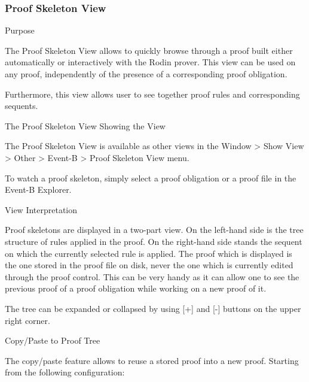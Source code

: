 \subsubsection{Proof Skeleton View}


Purpose

The Proof Skeleton View allows to quickly browse through a proof built either automatically or interactively with the Rodin prover. This view can be used on any proof, independently of the presence of a corresponding proof obligation.

Furthermore, this view allows user to see together proof rules and corresponding sequents.

The Proof Skeleton View
Showing the View

The Proof Skeleton View is available as other views in the Window > Show View > Other > Event-B > Proof Skeleton View menu.

To watch a proof skeleton, simply select a proof obligation or a proof file in the Event-B Explorer.

View Interpretation

Proof skeletons are displayed in a two-part view. On the left-hand side is the tree structure of rules applied in the proof. On the right-hand side stands the sequent on which the currently selected rule is applied. The proof which is displayed is the one stored in the proof file on disk, never the one which is currently edited through the proof control. This can be very handy as it can allow one to see the previous proof of a proof obligation while working on a new proof of it. 


The tree can be expanded or collapsed by using [+] and [-] buttons on the upper right corner.

Copy/Paste to Proof Tree

The copy/paste feature allows to reuse a stored proof into a new proof. Starting from the following configuration: 


